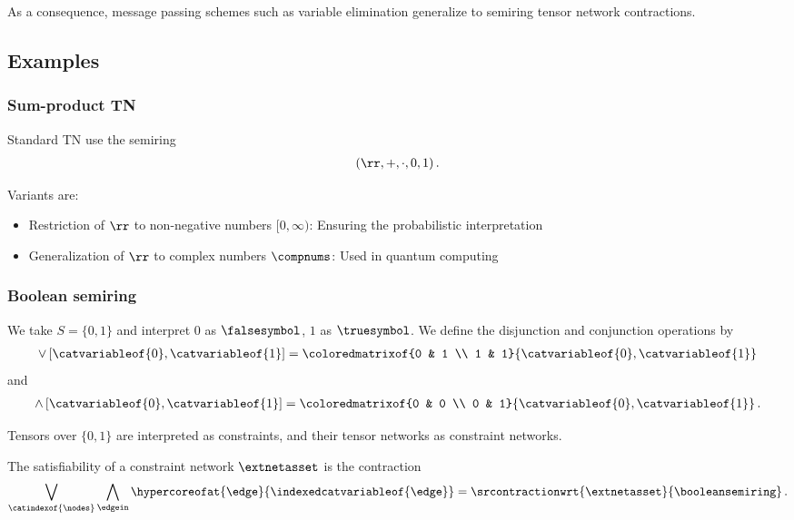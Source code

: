 As a consequence, message passing schemes such as variable elimination generalize to semiring tensor network contractions.

\subsection{Examples}

\subsubsection{Sum-product TN}\label{sec:complexSPContraction}

Standard TN use the semiring
\begin{align*}
    (\rr,+,\cdot,0,1)
    \, .
\end{align*}


Variants are:
\begin{itemize}
    \item Restriction of $\rr$ to non-negative numbers $[0,\infty)$: Ensuring the probabilistic interpretation
    \item Generalization of $\rr$ to complex numbers $\compnums$: Used in quantum computing
\end{itemize}

\subsubsection{Boolean semiring}

We take $S=\{0,1\}$ and interpret $0$ as $\falsesymbol$, $1$ as $\truesymbol$.
We define the disjunction and conjunction operations by
\begin{align*}
    \lor \left[\catvariableof{0},\catvariableof{1}\right]
    = \coloredmatrixof{0 & 1 \\ 1 & 1}{\catvariableof{0},\catvariableof{1}}
\end{align*}
and
\begin{align*}
    \land \left[\catvariableof{0},\catvariableof{1}\right]
    = \coloredmatrixof{0 & 0 \\ 0 & 1}{\catvariableof{0},\catvariableof{1}} \, .
\end{align*}

Tensors over $\{0,1\}$ are interpreted as constraints, and their tensor networks as constraint networks.

The satisfiability of a constraint network $\extnetasset$ is the contraction
\begin{align*}
    \bigvee_{\catindexof{\nodes}} \bigwedge_{\edgein} \hypercoreofat{\edge}{\indexedcatvariableof{\edge}}
    = \srcontractionwrt{
        \extnetasset
    }{\booleansemiring} \, .
\end{align*}

